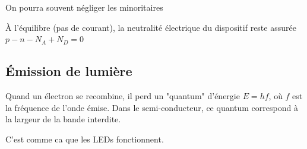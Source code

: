 \documentclass[12pt,a4paper]{article}
\begin{document}
On pourra souvent négliger les minoritaires

À l'équilibre (pas de courant), la neutralité électrique du dispositif reste assurée $p - n - N_A + N_D = 0$


\subsection{Émission de lumière}

Quand un électron se recombine, il perd un "quantum" d'énergie $E = hf$, où $f$ est la fréquence de l'onde émise. Dans le semi-conducteur, ce quantum correspond à la largeur de la bande interdite.

C'est comme ca que les LEDs fonctionnent.
\end{document}
